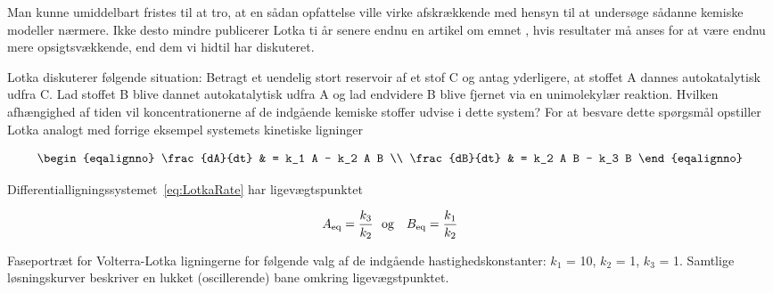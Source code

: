 Man kunne umiddelbart fristes til at tro, at en s{\aa}dan
opfattelse ville virke afskr{\ae}kkende med hensyn til at
unders{\o}ge s{\aa}danne kemiske modeller n{\ae}rmere.
Ikke desto mindre publicerer Lotka ti {\aa}r senere endnu
en artikel om emnet \cite{Lotka2}, hvis resultater m{\aa}
anses for at v{\ae}re endnu mere opsigts\-v{\ae}kkende,
end dem vi hidtil har diskuteret.

\vspace{4.0mm}
Lotka diskuterer f{\o}lgende situation: Betragt et uendelig
stort reservoir af et stof C og antag yderligere, at
stoffet A dannes autokatalytisk udfra C. Lad stoffet B
blive dannet autokatalytisk udfra A og lad endvidere B
blive fjernet via en unimolekyl{\ae}r reaktion. Hvilken
afh{\ae}ngighed af tiden vil koncentrationerne af de
indg{\aa}ende kemiske stoffer udvise i dette system? For at
besvare dette sp{\o}rgsm{\aa}l opstiller Lotka analogt med
forrige eksempel systemets kinetiske lig\-ninger

\begin{subequations}
  \begin{eqalignno}
   \frac{dA}{dt} & = k_1 A - k_2 A B \\
   \frac{dB}{dt} & = k_2 A B - k_3 B
  \end{eqalignno}
  \label{eq:LotkaRate}
\end{subequations}

Differentiallig\-ningssystemet~\ref{eq:LotkaRate} har
ligev{\ae}gts\-punktet

\begin{equation}
  A_{\rm eq} = \frac{k_3}{k_2} \mbox{\ \ og \ \ }
  B_{\rm eq} = \frac{k_1}{k_2}
  \label{eq:LotkaEqui}
\end{equation}

{
\begin{center}
 \vspace{1cm}
  
 \vspace{1cm}
\end{center}
}
{
\caption{\protect\capsize 
Faseportr{\ae}t for Volterra-Lotka lig\-ningerne for
f{\o}lgende valg af de indg{\aa}ende
hastigheds\-konstanter: $k_1$ = 10, $k_2$ = 1, $k_3$ = 1.
Samtlige l{\o}sningskurver beskriver en lukket
(oscillerende) bane omkring ligev{\ae}gstpunktet.
\label{fig:LotkaVolterraPlot}}
}

